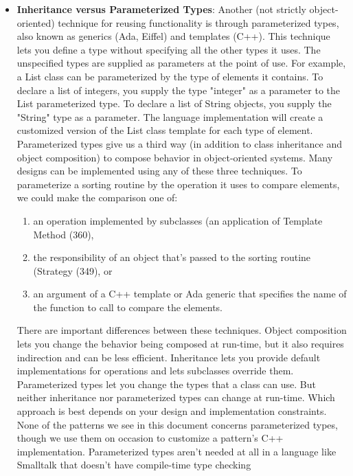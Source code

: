 \documentclass{report}
\begin{document}
\begin{itemize}
        \item \textbf{Inheritance versus Parameterized Types}: Another (not strictly object-oriented) technique for reusing functionality is through parameterized types, also known as generics (Ada, Eiffel) and templates (C++). This technique lets you define a type without specifying all the other types it uses. The unspecified types are supplied as parameters at the point of use. For example, a List class can be parameterized by the type of elements it contains. To declare a list of integers, you supply the type "integer" as a parameter to the List parameterized type. To declare a list of String objects, you supply the "String" type as a parameter. The language implementation will create a customized version of the List class template for each type of element.
            \bigbreak \noindent 
            Parameterized types give us a third way (in addition to class inheritance and object composition) to compose behavior in object-oriented systems. Many designs can be implemented using any of these three techniques. To parameterize a sorting routine by the operation it uses to compare elements, we could make the comparison one of:
            \begin{enumerate}
                \item an operation implemented by subclasses (an application of Template Method (360),
                \item the responsibility of an object that's passed to the sorting routine (Strategy (349), or
                \item an argument of a C++ template or Ada generic that specifies the name of the function to call to compare the elements.
            \end{enumerate}
            There are important differences between these techniques. Object composition lets you change the behavior being composed at run-time, but it also requires indirection and can be less efficient. Inheritance lets you provide default implementations for operations and lets subclasses override them. Parameterized types let you change the types that a class can use. But neither inheritance nor parameterized types can change at run-time. Which approach is best depends on your design and implementation constraints.
            \bigbreak \noindent 
            None of the patterns we see in this document concerns parameterized types, though we use them on occasion to customize a pattern's C++ implementation. Parameterized types aren't needed at all in a language like Smalltalk that doesn't have compile-time type checking

\end{itemize}
\end{document}
